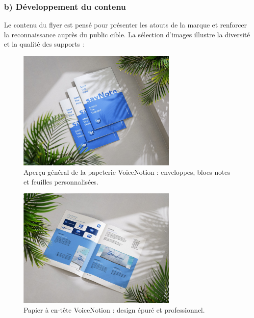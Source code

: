 \subsubsection*{b) Développement du contenu}
Le contenu du flyer est pensé pour présenter les atouts de la marque et renforcer la reconnaissance auprès du public cible. La sélection d’images illustre la diversité et la qualité des supports :

\begin{figure}[H]
    \centering
    \includegraphics[width=0.7\textwidth]{docs/visual-indentity/pictures/pappiers.jpg}
    \caption{Aperçu général de la papeterie VoiceNotion : enveloppes, blocs-notes et feuilles personnalisées.}
\end{figure}
\begin{figure}[H]
    \centering
    \includegraphics[width=0.7\textwidth]{docs/visual-indentity/pictures/pappier.jpg}
    \caption{Papier à en-tête VoiceNotion : design épuré et professionnel.}
\end{figure}

